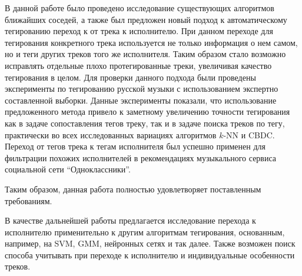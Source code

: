 \startconclusionpage

В данной работе было проведено исследование существующих алгоритмов ближайших соседей, 
а также был предложен новый подход к автоматическому тегированию \ld переход к от трека к исполнителю.
При данном переходе для тегирования конкретного трека используется не только информация о нем самом,
но и теги других треков того же исполнителя. Таким образом стало возможно исправлять отдельные плохо 
протегированные треки, увеличивая качество тегирования в целом.
Для проверки данного подхода были проведены эксперименты по тегированию русской музыки с использованием
экспертно составленной выборки. Данные эксперименты показали, что использование предложенного метода 
привело к заметному увеличению точности тегирования как в задаче сопоставления тегов треку, так и в задаче поиска треков
по тегу, практически во всех исследованных вариациях алгоритмов $k$-NN и CBDC.
Переход от тегов трека к тегам исполнителя был успешно применен для фильтрации похожих исполнителей в 
рекомендациях музыкального сервиса социальной сети ``Одноклассники''.

Таким образом, данная работа полностью удовлетворяет поставленным требованиям.

В качестве дальнейшей работы предлагается исследование перехода к исполнителю применительно к другим
алгоритмам тегирования, основанным, например, на SVM, GMM, нейронных сетях и так далее. Также возможен
поиск способа учитывать при переходе к исполнителю и индивидуальные особенности треков.

